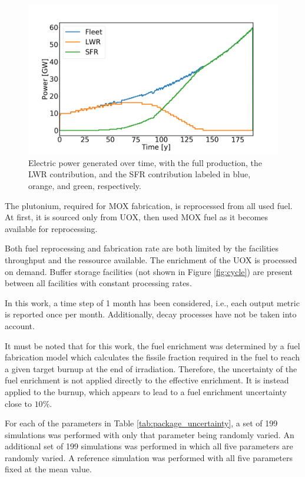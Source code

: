 \documentclass{anstrans}
\begin{document}
\begin{figure}[ht] %
    \centering
    \includegraphics[scale=0.18]{power.png}
    \caption{Electric power generated over time, with the full production,
        the \gls{LWR} contribution, and the \gls{SFR} contribution labeled in blue, orange, and green, respectively.}
    \label{fig:power}
\end{figure}


The plutonium, required for \gls{MOX} fabrication, is reprocessed from all
used fuel.  At first, it is sourced only from \gls{UOX}, then used \gls{MOX} fuel
as it becomes available for reprocessing.

Both fuel reprocessing and fabrication rate are both limited by the facilities
throughput and the ressource available.  The enrichment of the \gls{UOX} is processed
on demand.  Buffer storage facilities (not shown in Figure \ref{fig:cycle}) are present
between all facilities with constant processing rates.

In this work, a time step of 1 month has been considered, i.e., each output
metric is reported once per month. Additionally, decay processes have not be
taken into account.  

It must be noted that for this work, the fuel enrichment was determined by a
fuel fabrication model\cite{Leniau2015125} which
calculates the fissile fraction required in the fuel to reach a given target
burnup at the end of irradiation.  Therefore, the uncertainty of the fuel
enrichment is not applied directly to the effective enrichment. It is instead applied to the
burnup, which appears to lead to a fuel enrichment uncertainty close to
$10\%$.

For each of the parameters in Table \ref{tab:package_uncertainty}, a set of
199 simulations was performed with only that parameter being randomly varied.
An additional set of 199 simulations was performed in which all five
parameters are randomly varied.  A reference simulation was performed
with all five parameters fixed at the mean value.
\end{document}
